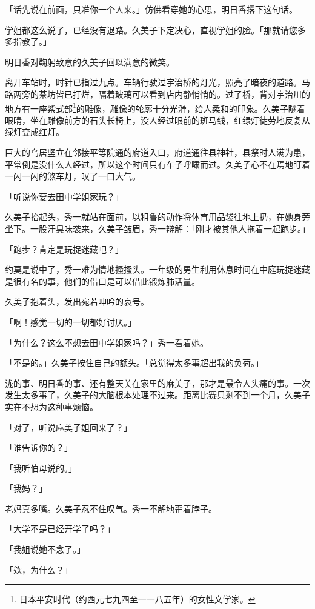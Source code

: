 \documentclass[UTF8]{ctexart}
\begin{document}
    「话先说在前面，只准你一个人来。」仿佛看穿她的心思，明日香撂下这句话。 

    学姐都这么说了，已经没有退路。久美子下定决心，直视学姐的脸。「那就请您多多指教了。」 

    明日香对鞠躬致意的久美子回以满意的微笑。 

    离开车站时，时针已指过九点。车辆行驶过宇治桥的灯光，照亮了暗夜的道路。马路两旁的茶坊皆已打烊，隔着玻璃可以看到店内静悄悄的。过了桥，背对宇治川的地方有一座紫式部\footnote{日本平安时代（约西元七九四至一一八五年）的女性文学家。}的雕像，雕像的轮廓十分光滑，给人柔和的印象。久美子瞇着眼睛，坐在雕像前方的石头长椅上，没人经过眼前的斑马线，红绿灯徒劳地反复从绿灯变成红灯。

    巨大的鸟居竖立在邻接平等院通的府道入口，府道通往县神社，县祭时人满为患，平常倒是没什么人经过，所以这个时间只有车子呼啸而过。久美子心不在焉地盯着一闪一闪的煞车灯，叹了一口大气。 

    「听说你要去田中学姐家玩？」 

    久美子抬起头，秀一就站在面前，以粗鲁的动作将体育用品袋往地上扔，在她身旁坐下。一股汗臭味袭来，久美子皱眉，秀一辩解：「刚才被其他人拖着一起跑步。」 

    「跑步？肯定是玩捉迷藏吧？」 

    约莫是说中了，秀一难为情地搔搔头。一年级的男生利用休息时间在中庭玩捉迷藏是很有名的事，他们的借口是可以借此锻炼肺活量。 

    久美子抱着头，发出宛若呻吟的哀号。 

    「啊！感觉一切的一切都好讨厌。」 

    「为什么？这么不想去田中学姐家吗？」秀一看着她。 

    「不是的。」久美子按住自己的额头。「总觉得太多事超出我的负荷。」 

    泷的事、明日香的事、还有整天关在家里的麻美子，那才是最令人头痛的事。一次发生太多事了，久美子的大脑根本处理不过来。距离比赛只剩不到一个月，久美子实在不想为这种事烦恼。 

    「对了，听说麻美子姐回来了？」 

    「谁告诉你的？」 

    「我听伯母说的。」 

    「我妈？」 

    老妈真多嘴。久美子忍不住叹气。秀一不解地歪着脖子。 

    「大学不是已经开学了吗？」 

    「我姐说她不念了。」 

    「欸，为什么？」 
\end{document}
